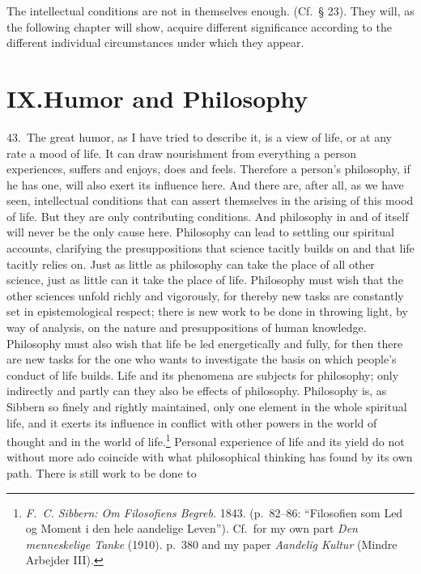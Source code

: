 \documentclass[12pt]{book}
\newcommand{\opage}[1]{\marginnote{\footnotesize\textit{[#1]}}}
\begin{document}
The intellectual conditions are not in themselves enough. (Cf.\ § 23). They will, as the
following chapter will show, acquire different significance according to the different
individual circumstances under which they appear.

\chapter*{IX.\quad Humor and Philosophy}
\opage{145}43.~The great humor, as I have tried to describe it, is a view of life, or at any
rate a mood of life. It can draw nourishment from everything a person experiences, suffers and
enjoys, does and feels. Therefore a person's philosophy, if he has one, will also exert its
influence here. And there are, after all, as we have seen, intellectual conditions that can
assert themselves in the arising of this mood of life. But they are only contributing
conditions. And philosophy in and of itself will never be the only cause here. Philosophy can
lead to settling our spiritual accounts, clarifying the presuppositions that science tacitly
builds on and that life tacitly relies on. Just as little as philosophy can take the place of
all other science, just as little can it take the place of life. Philosophy must wish that the
other sciences unfold richly and vigorously, for thereby new tasks are constantly set in
epistemological respect; there is new work to be done in throwing light, by way of analysis, on
the nature and presuppositions of human knowledge. Philosophy must also wish that life be led
energetically and fully, for then there are new tasks for the one who wants to investigate the
basis on which people's conduct of life builds. Life and its phenomena are subjects for
philosophy; only indirectly and partly can they also be effects of philosophy. Philosophy is,
as Sibbern so finely and rightly maintained, only one element in the whole spiritual life, and
it exerts its influence in conflict with other powers in the world of thought and in the world
of life.\footnote{\textit{F.~C. Sibbern: Om Filosofiens Begreb.} 1843. (p.~82--86:
``Filosofien som Led og Moment i den hele aandelige Leven''). Cf.\ for my own part \textit{Den
menneskelige Tanke} (1910). p.~380 and my paper \textit{Aandelig Kultur} (Mindre Arbejder
III).} Personal experience of life and its \opage{146}yield do not without more ado coincide
with what philosophical thinking has found by its own path. There is still work to be done to
\end{document}
